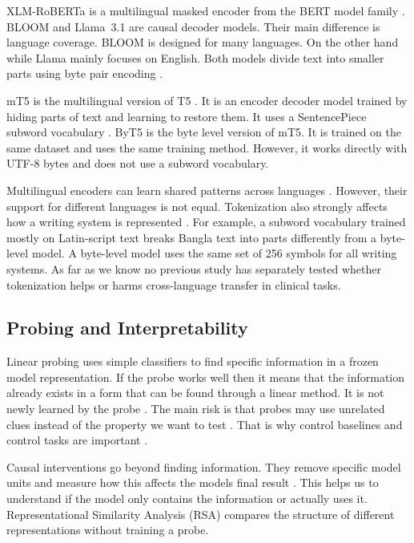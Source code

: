 \documentclass[preprint,12pt,authoryear]{elsarticle}
\begin{document}
XLM-RoBERTa \citep{conneau2020xlmr} is a multilingual masked encoder from the BERT model family \citep{devlin2019bert}. BLOOM \citep{scao2022bloom} and Llama~3.1 \citep{dubey2024llama3} are causal decoder models. Their main difference is language coverage. BLOOM is designed for many languages. On the other hand while Llama mainly focuses on English. Both models divide text into smaller parts using byte pair encoding \citep{sennrich2016bpe}.

mT5 \citep{xue2021mt5} is the multilingual version of T5 \citep{raffel2020t5}. It is an encoder decoder model trained by hiding parts of text and learning to restore them. It uses a SentencePiece subword vocabulary \citep{kudo2018sentencepiece}. ByT5 \citep{xue2022byt5} is the byte level version of mT5. It is trained on the same dataset and uses the same training method. However, it works directly with UTF-8 bytes and does not use a subword vocabulary.

Multilingual encoders can learn shared patterns across languages \citep{pires2019mbert,wu2020emerging,artetxe2020cross}. However, their support for different languages is not equal. Tokenization also strongly affects how a writing system is represented \citep{rust2021tokenizer}. For example, a subword vocabulary trained mostly on Latin-script text breaks Bangla text into parts differently from a byte-level model. A byte-level model uses the same set of 256 symbols for all writing systems. As far as we know no previous study has separately tested whether tokenization helps or harms cross-language transfer in clinical tasks.

\subsection{Probing and Interpretability}
Linear probing uses simple classifiers to find specific information in a frozen model representation. If the probe works well then it means that the information already exists in a form that can be found through a linear method. It is not newly learned by the probe \citep{alain2017probes,conneau2018probing,hewitt2019structural,belinkov2022probing}.
The main risk is that probes may use unrelated clues instead of the property we want to test \citep{belinkov2022probing,pimentel2020information}. That is why control baselines and control tasks are important \citep{hewitt2019control}.

Causal interventions go beyond finding information. They remove specific model units and measure how this affects the models final result \citep{vig2020causal,meng2022rome}. This helps us to understand if the model only contains the information or actually uses it. Representational Similarity Analysis (RSA) \citep{kriegeskorte2008rsa} compares the structure of different representations without training a probe.
\end{document}
